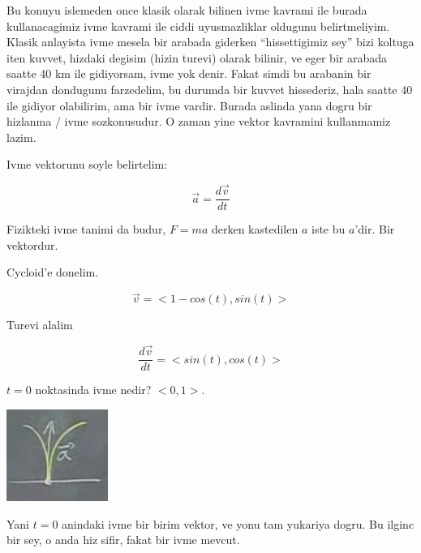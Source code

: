 \documentclass[12pt,fleqn]{article}
\begin{document}
Bu konuyu islemeden once klasik olarak bilinen ivme kavrami ile burada
kullanacagimiz ivme kavrami ile ciddi uyusmazliklar oldugunu
belirtmeliyim. Klasik anlayista ivme mesela bir arabada giderken
``hissettigimiz sey'' bizi koltuga iten kuvvet, hizdaki degisim (hizin
turevi) olarak bilinir, ve eger bir arabada saatte 40 km ile gidiyorsam,
ivme yok denir. Fakat simdi bu arabanin bir virajdan dondugunu farzedelim,
bu durumda bir kuvvet hissederiz, hala saatte 40 ile gidiyor olabilirim,
ama bir ivme vardir. Burada aslinda yana dogru bir hizlanma / ivme
sozkonusudur. O zaman yine vektor kavramini kullanmamiz lazim. 

Ivme vektorunu soyle belirtelim:

\[ \vec{a} = \frac{d\vec{v}}{dt} \]

Fizikteki ivme tanimi da budur, $F = ma$ derken kastedilen $a$ iste bu
$a$'dir. Bir vektordur. 

Cycloid'e donelim. 

\[ \vec{v} = <1-cos(t),sin(t)>\]

Turevi alalim

\[ \frac{d\vec{v}}{dt} = <sin(t), cos(t)>\]

$t=0$ noktasinda ivme nedir? $<0,1>$. 

\includegraphics[height=3cm]{6_2.png}

Yani $t=0$ anindaki ivme bir birim vektor, ve yonu tam yukariya dogru. Bu
ilginc bir sey, o anda hiz sifir, fakat bir ivme mevcut. 
\end{document}
